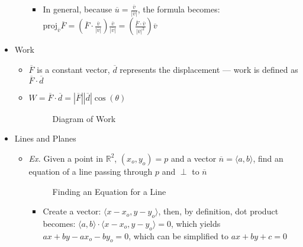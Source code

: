 \begin{itemize}
\begin{itemize}
\begin{itemize}
          \item In general, because $\overline{u}=\frac{\overline{v}}{|\overline{v}|}$, the formula becomes: $\text{proj}_{\overline{v}}\overline{F}=\left( \overline{F}\cdot\frac{\overline{v}}{|\overline{v}|} \right)\frac{\overline{v}}{|\overline{v}|}=\left( \frac{\overline{F}\cdot\overline{v}}{|\overline{v}|^2} \right)\overline{v}$

        \end{itemize}

    \end{itemize}

    \newpage

    \item Work

      \begin{itemize}

        \item $\overline{F}$ is a constant vector, $\overline{d}$ represents the displacement — work is defined as $\overline{F}\cdot\overline{d}$

        \item $W=\overline{F}\cdot\overline{d}=|\overline{F}||\overline{d}|\cos(\theta)$\\

        \begin{figure}[h!]
          \centering 
          \caption{Diagram of Work}
        \end{figure}

      \end{itemize}

    \item Lines and Planes

      \begin{itemize}

        \item \textit{Ex.} Given a point in $\mathbb{R}^2$, $( x_o, y_o ) = p$ and a vector $\overline{n}=\langle a, b \rangle$, find an equation of a line passing through $p$ and $\perp$ to $\overline{n}$

          \begin{figure}[h!]
            \centering 
            \caption{Finding an Equation for a Line}
          \end{figure}

          \begin{itemize}

            \item Create a vector: $\langle x - x_o, y - y_o \rangle$, then, by definition, dot product becomes: $\langle a, b \rangle \cdot \langle x - x_o, y - y_o \rangle = 0$, which yields $ax + by - ax_o - by_o = 0$, which can be simplified to $ax+by+c=0$


\end{itemize}
\end{itemize}
\end{itemize}
